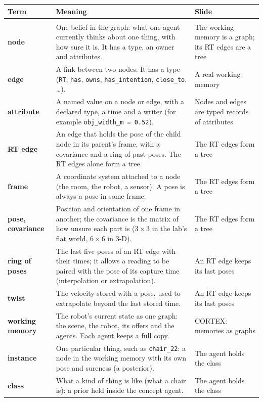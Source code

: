 \documentclass[11pt]{article}
\begin{document}
\small
\setlength{\LTpre}{2pt}\setlength{\LTpost}{2pt}
\renewcommand{\arraystretch}{1.12}
\begin{longtable}{@{}>{\raggedright\bfseries}p{2.8cm} p{8.9cm} >{\raggedright\arraybackslash}p{4.2cm}@{}}
\toprule
Term & Meaning & Slide\\\midrule\endhead
\multicolumn{3}{@{}l}{\emph{The graph and its parts}}\\
node & One belief in the graph: what one agent currently thinks about one thing, with how sure it is. It has a type, an owner and attributes. & The working memory is a graph; its RT edges are a tree\\
edge & A link between two nodes. It has a type (\texttt{RT}, \texttt{has}, \texttt{owns}, \texttt{has\_intention}, \texttt{close\_to}, \ldots). & A real working memory\\
attribute & A named value on a node or edge, with a declared type, a time and a writer (for example \texttt{obj\_width\_m = 0.52}). & Nodes and edges are typed records of attributes\\
RT edge & An edge that holds the pose of the child node in its parent's frame, with a covariance and a ring of past poses. The RT edges alone form a tree. & The RT edges form a tree\\
frame & A coordinate system attached to a node (the room, the robot, a sensor). A pose is always a pose in some frame. & The RT edges form a tree\\
pose, covariance & Position and orientation of one frame in another; the covariance is the matrix of how unsure each part is ($3\times3$ in the lab's flat world, $6\times6$ in 3-D). & The RT edges form a tree\\
ring of poses & The last five poses of an RT edge with their times; it allows a reading to be paired with the pose of its capture time (interpolation or extrapolation). & An RT edge keeps its last poses\\
twist & The velocity stored with a pose, used to extrapolate beyond the last stored time. & An RT edge keeps its last poses\\
working memory & The robot's current state as one graph: the scene, the robot, its offers and the agents. Each agent keeps a full copy. & CORTEX: memories as graphs\\
instance & One particular thing, such as \texttt{chair\_22}: a node in the working memory with its own pose and sureness (a posterior). & The agent holds the class\\
class & What a kind of thing is like (what a chair is): a prior held inside the concept agent. & The agent holds the class\\

\end{longtable}
\end{document}
